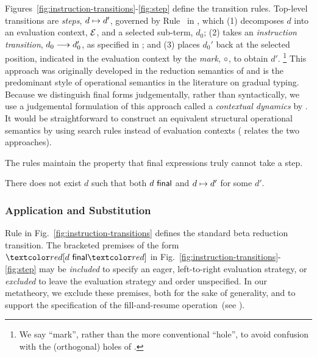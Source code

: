 Figures~\ref{fig:instruction-transitions}-\ref{fig:step} define the transition rules.
%
Top-level transitions are \emph{steps}, $d \mapsto d'$, governed by Rule~ in , which
%
(1) decomposes $d$ into an evaluation context, $\mathcal{E}$, and a selected sub-term, $d_0$;
%
(2) takes an \emph{instruction transition}, $d_0 \longrightarrow d_0'$, as specified in ;
%
and (3) places $d_0'$ back at the selected position, indicated in
the evaluation context by the \emph{mark}, $\circ$, to obtain $d'$.%
\footnote{
        We say ``mark'', rather than the more conventional ``hole'', to avoid confusion with the (orthogonal) holes of \HazelnutLive.
        }
%
This approach was originally developed in the reduction semantics of \citet{DBLP:journals/tcs/FelleisenH92} and is the predominant style of operational semantics in the literature on gradual typing.
Because we distinguish final forms judgementally, rather than syntactically, we use a judgemental formulation of this approach called a \emph{contextual dynamics} by \citet{pfpl}.
It would be straightforward to construct an equivalent structural operational semantics \cite{DBLP:journals/jlp/Plotkin04a} by using search rules instead of evaluation contexts (\citet{pfpl} relates the two approaches).

The rules maintain the property that final expressions truly cannot take a step.%
\begin{thm}[Finality] There does not exist $d$ such that both $d~\mathsf{final}$ and $d \mapsto d'$ for some $d'$.
\end{thm}


\subsubsection{Application and Substitution}

%
Rule  in Fig.~\ref{fig:instruction-transitions} defines the
standard beta reduction transition.
%
The bracketed premises of the form $\maybePremise{\isFinal{\dexp}}$ in
Fig.~\ref{fig:instruction-transitions}-\ref{fig:step} may be \emph{included}
to specify an eager, left-to-right evaluation strategy, or \emph{excluded} to
leave the evaluation strategy and order unspecified.
%
In our metatheory, we exclude these premises, both for
the sake of generality, and to support the specification of the fill-and-resume operation~(see ).



